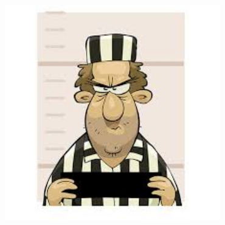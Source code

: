 \documentclass[11pt]{beamer}
\begin{document}
\begin{frame}
\begin{columns}
\begin{column}{0.6\textwidth}
\begin{itemize}
                \end{itemize}
            \end{column}
            \begin{column}{0.4\textwidth} 
        \includegraphics[width=1\textwidth]{figures/terrorist.jpg}
            \end{column}
        \end{columns}  
    \end{frame}
\end{document}
